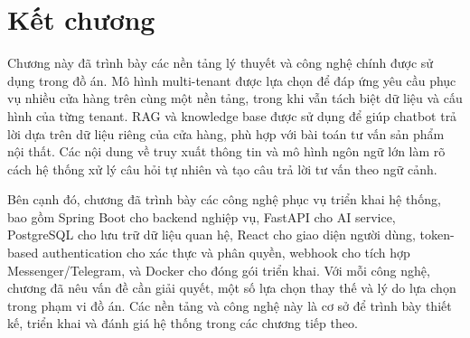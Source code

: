 \documentclass[../DoAn.tex]{subfiles}
\begin{document}
\section{Kết chương}
\label{section:3.ket_chuong}

Chương này đã trình bày các nền tảng lý thuyết và công nghệ chính được sử dụng trong đồ án. Mô hình multi-tenant được lựa chọn để đáp ứng yêu cầu phục vụ nhiều cửa hàng trên cùng một nền tảng, trong khi vẫn tách biệt dữ liệu và cấu hình của từng tenant. RAG và knowledge base được sử dụng để giúp chatbot trả lời dựa trên dữ liệu riêng của cửa hàng, phù hợp với bài toán tư vấn sản phẩm nội thất. Các nội dung về truy xuất thông tin và mô hình ngôn ngữ lớn làm rõ cách hệ thống xử lý câu hỏi tự nhiên và tạo câu trả lời tư vấn theo ngữ cảnh.

Bên cạnh đó, chương đã trình bày các công nghệ phục vụ triển khai hệ thống, bao gồm Spring Boot cho backend nghiệp vụ, FastAPI cho AI service, PostgreSQL cho lưu trữ dữ liệu quan hệ, React cho giao diện người dùng, token-based authentication cho xác thực và phân quyền, webhook cho tích hợp Messenger/Telegram, và Docker cho đóng gói triển khai. Với mỗi công nghệ, chương đã nêu vấn đề cần giải quyết, một số lựa chọn thay thế và lý do lựa chọn trong phạm vi đồ án. Các nền tảng và công nghệ này là cơ sở để trình bày thiết kế, triển khai và đánh giá hệ thống trong các chương tiếp theo.
\end{document}

